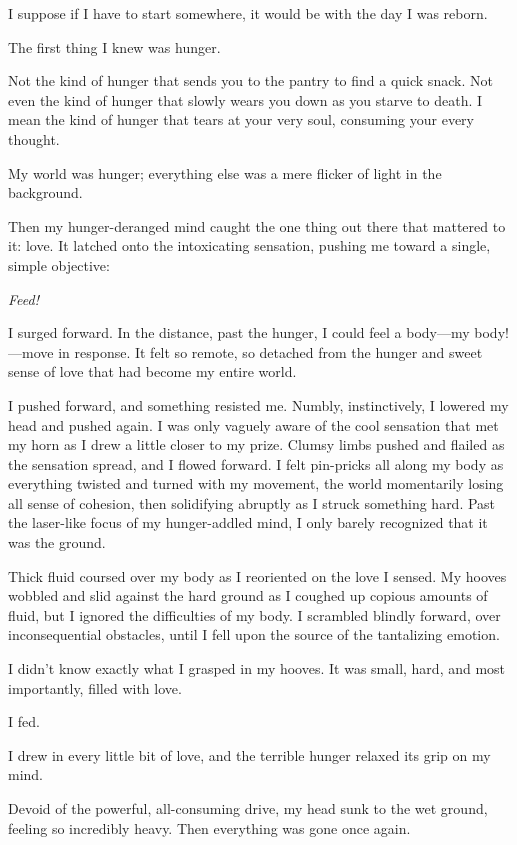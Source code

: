 I suppose if I have to start somewhere, it would be with the day I was reborn.

{\br}%
The first thing I knew was hunger.

Not the kind of hunger that sends you to the pantry to find a quick snack. Not even the kind of hunger that slowly wears you down as you starve to death. I mean the kind of hunger that tears at your very soul, consuming your every thought.

My world was hunger; everything else was a mere flicker of light in the background.

Then my hunger-deranged mind caught the one thing out there that mattered to it: love. It latched onto the intoxicating sensation, pushing me toward a single, simple objective:

\textit{Feed!}

I surged forward. In the distance, past the hunger, I could feel a body—my body!—move in response. It felt so remote, so detached from the hunger and sweet sense of love that had become my entire world.

I pushed forward, and something resisted me. Numbly, instinctively, I lowered my head and pushed again. I was only vaguely aware of the cool sensation that met my horn as I drew a little closer to my prize. Clumsy limbs pushed and flailed as the sensation spread, and I flowed forward. I felt pin-pricks all along my body as everything twisted and turned with my movement, the world momentarily losing all sense of cohesion, then solidifying abruptly as I struck something hard. Past the laser-like focus of my hunger-addled mind, I only barely recognized that it was the ground.

Thick fluid coursed over my body as I reoriented on the love I sensed. My hooves wobbled and slid against the hard ground as I coughed up copious amounts of fluid, but I ignored the difficulties of my body. I scrambled blindly forward, over inconsequential obstacles, until I fell upon the source of the tantalizing emotion.

I didn’t know exactly what I grasped in my hooves. It was small, hard, and most importantly, filled with love.

I fed.

I drew in every little bit of love, and the terrible hunger relaxed its grip on my mind.

Devoid of the powerful, all-consuming drive, my head sunk to the wet ground, feeling so incredibly heavy. Then everything was gone once again.

